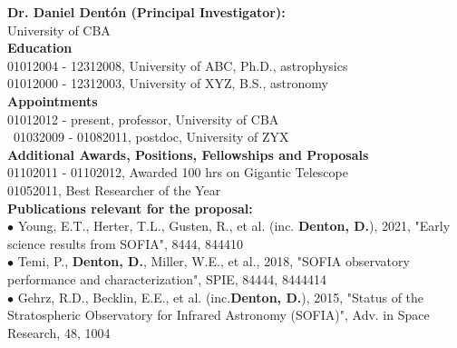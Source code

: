 %
\textbf{\color{Blue}\large Dr. Daniel Dent{\'o}n (Principal Investigator):}\\
University of CBA\\
\medskip
\textbf{Education}\\
01012004 - 12312008, University of ABC, Ph.D., astrophysics\\
01012000 - 12312003, University of XYZ, B.S., astronomy\\
\vspace{2ex}
\textbf{Appointments}\\
01012012 - present, professor, University of CBA\\\
01032009 - 01082011, postdoc, University of ZYX\\
\vspace{2ex}
\textbf{Additional Awards, Positions, Fellowships and Proposals}\\
01102011 - 01102012, Awarded 100 hrs on Gigantic Telescope\\
01052011, Best Researcher of the Year\\
\vspace{2ex}
\textbf{Publications relevant for the proposal:}\\
{\scriptsize{$\bullet$}} Young, E.T., Herter, T.L., Gusten, R., et al. (inc. \textbf{Denton, D.}), 2021, "Early science results from SOFIA", 8444, 844410\\
{\scriptsize{$\bullet$}} Temi, P., \textbf{Denton, D.}, Miller, W.E., et al., 2018, "SOFIA observatory performance and characterization", SPIE, 84444, 8444414\\
{\scriptsize{$\bullet$}} Gehrz, R.D., Becklin, E.E., et al. (inc.\textbf{Denton, D.}), 2015, "Status of the Stratospheric Observatory for Infrared Astronomy (SOFIA)", Adv. in Space Research, 48, 1004\\
